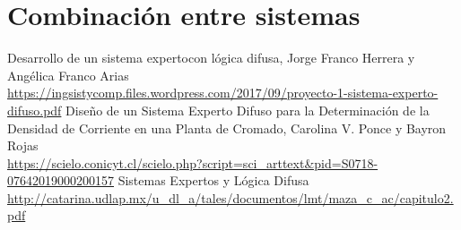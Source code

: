 \documentclass[a4paper, 11pt, titlepage]{article}
\begin{document}
\section{Combinación entre sistemas}

\newpage
\begin{thebibliography}{X}
    \bibitem{} Desarrollo de un sistema expertocon lógica difusa, Jorge Franco Herrera y Angélica Franco Arias \\ \url{https://ingsistycomp.files.wordpress.com/2017/09/proyecto-1-sistema-experto-difuso.pdf}
    \bibitem{} Diseño de un Sistema Experto Difuso para la Determinación de la Densidad de Corriente en una Planta de Cromado, Carolina V. Ponce y Bayron Rojas \\ \url{https://scielo.conicyt.cl/scielo.php?script=sci_arttext&pid=S0718-07642019000200157}
    \bibitem{} Sistemas Expertos y Lógica Difusa \\ \url{http://catarina.udlap.mx/u_dl_a/tales/documentos/lmt/maza_c_ac/capitulo2.pdf}
\end{thebibliography}
\end{document}
